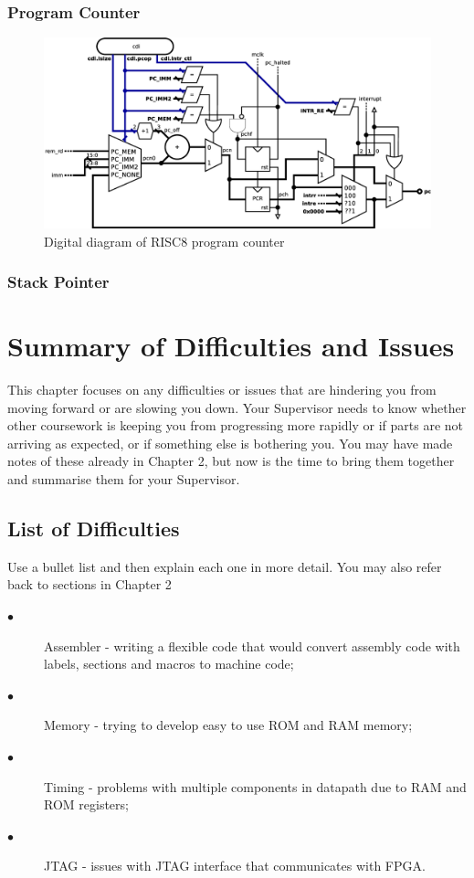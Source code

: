 \documentclass[a4paper,12pt]{article}
\begin{document}
\begin{multicols}{2}
\subsubsection{Program Counter}
\begin{figure}
	\centering
	\includegraphics[width=\linewidth]{graphics/program_counter.eps}
	\caption{Digital diagram of RISC8 program counter}
\end{figure}


\subsubsection{Stack Pointer}

\section{Summary of Difficulties and Issues}
This chapter focuses on any difficulties or issues that are hindering you from moving forward or are slowing you down. Your Supervisor needs to know whether other coursework is keeping you from progressing more rapidly or if parts are not arriving as expected, or if something else is bothering you. You may have made notes of these already in Chapter 2, but now is the time to bring them together and summarise them for your Supervisor.


\subsection{List of Difficulties}
Use a bullet list and then explain each one in more detail. You may also refer back to sections in Chapter 2
\begin{description}
	\item[$\bullet$] Assembler - writing a flexible code that would convert assembly code with labels, sections and macros to machine code;
	\item[$\bullet$] Memory - trying to develop easy to use ROM and RAM memory;
	\item[$\bullet$] Timing - problems with multiple components in datapath due to RAM and ROM registers;
	\item[$\bullet$] JTAG - issues with JTAG interface that communicates with FPGA.
\end{description}


\end{multicols}
\end{document}
